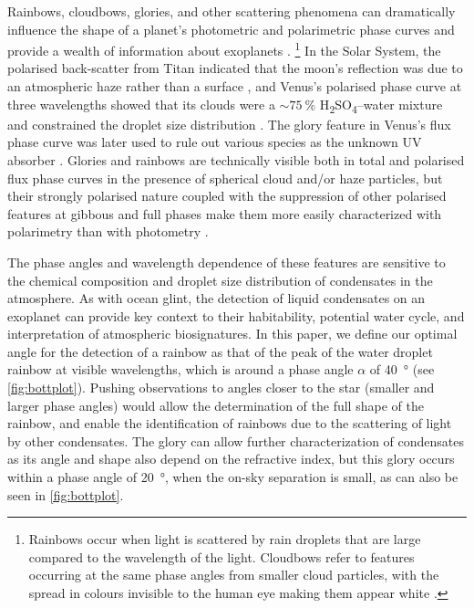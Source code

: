 \documentclass[usenatbib]{mnras}
\begin{document}
Rainbows, cloudbows, glories, and other scattering phenomena can dramatically influence the shape of a planet's photometric and polarimetric phase curves and provide a wealth of information about exoplanets \citep{karalidi2012rainbow, stam2008,bailey2007,2014A&A...566L...1G}.%
\footnote{
    Rainbows occur when light is scattered by rain droplets that are large compared to the wavelength of the light. 
    Cloudbows refer to features occurring at the same phase angles from smaller cloud particles, with the spread in colours invisible to the human eye making them appear white \citep[for further discussion, see][]{bailey2007}.  
}
%
In the Solar System, the polarised back-scatter from Titan indicated that the moon's reflection was due to an atmospheric haze rather than a surface \citep{zellner1973polarization}, and Venus's polarised phase curve at three wavelengths showed that its clouds were a $\sim\qty{75}{\percent}$ H\textsubscript{2}SO\textsubscript{4}--water mixture and constrained the droplet size distribution \citep{hansenhovenier1974}.
%
The glory feature in Venus's flux phase curve was later used to rule out various species as the unknown UV absorber \citep{petrova2018glory}.
%
Glories and rainbows are technically visible both in total and polarised flux phase curves in the presence of spherical cloud and/or haze particles, but their strongly polarised nature coupled with the suppression of other polarised features at gibbous and full phases make them more easily characterized with polarimetry than with photometry \citep{karalidi2011, stam2008, treesandstam2019,trees2022}.
%

The phase angles and wavelength dependence of these features are sensitive to the chemical composition and droplet size distribution of condensates in the atmosphere. 
%
As with ocean glint, the detection of liquid condensates on an exoplanet can provide key context to their habitability, potential water cycle, and interpretation of atmospheric biosignatures.
%
In this paper, we define our optimal angle for the detection of a rainbow as that of the peak of the water droplet rainbow at visible wavelengths, which is around a phase angle $\alpha$ of \qty{40}{\degree} (see \cref{fig:bottplot}).
%
Pushing observations to angles closer to the star (smaller and larger phase angles) would allow the determination of the full shape of the rainbow, and enable the identification of rainbows due to the scattering of light by other condensates.
%
The glory can allow further characterization of condensates as its angle and shape also depend on the refractive index, but this glory occurs within a phase angle of \qty{20}{\degree}, when the on-sky separation is small, as can also be seen in \cref{fig:bottplot}. 
\end{document}

